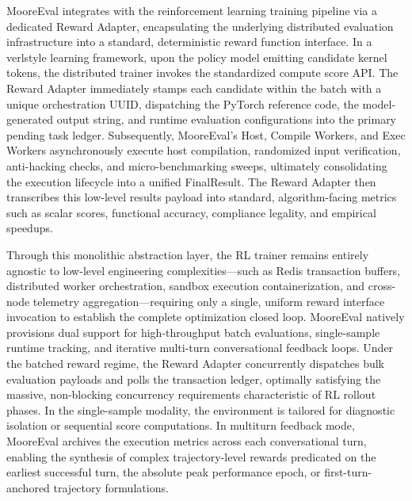 \documentclass[
  10
]{article}
\begin{document}
MooreEval integrates with the reinforcement learning training pipeline
via a dedicated Reward Adapter, encapsulating the underlying distributed
evaluation infrastructure into a standard, deterministic reward function
interface. In a verlstyle learning framework, upon the policy model
emitting candidate kernel tokens, the distributed trainer invokes the
standardized compute score API. The Reward Adapter immediately stamps
each candidate within the batch with a unique orchestration UUID,
dispatching the PyTorch reference code, the model-generated output
string, and runtime evaluation configurations into the primary pending
task ledger. Subsequently, MooreEval's Host, Compile Workers, and Exec
Workers asynchronously execute host compilation, randomized input
verification, anti-hacking checks, and micro-benchmarking sweeps,
ultimately consolidating the execution lifecycle into a unified
FinalResult. The Reward Adapter then transcribes this low-level results
payload into standard, algorithm-facing metrics such as scalar scores,
functional accuracy, compliance legality, and empirical speedups.

Through this monolithic abstraction layer, the RL trainer remains
entirely agnostic to low-level engineering complexities---such as Redis
transaction buffers, distributed worker orchestration, sandbox execution
containerization, and cross-node telemetry aggregation---requiring only
a single, uniform reward interface invocation to establish the complete
optimization closed loop. MooreEval natively provisions dual support for
high-throughput batch evaluations, single-sample runtime tracking, and
iterative multi-turn conversational feedback loops. Under the batched
reward regime, the Reward Adapter concurrently dispatches bulk
evaluation payloads and polls the transaction ledger, optimally
satisfying the massive, non-blocking concurrency requirements
characteristic of RL rollout phases. In the single-sample modality, the
environment is tailored for diagnostic isolation or sequential score
computations. In multiturn feedback mode, MooreEval archives the
execution metrics across each conversational turn, enabling the
synthesis of complex trajectory-level rewards predicated on the earliest
successful turn, the absolute peak performance epoch, or
first-turn-anchored trajectory formulations.
\end{document}
